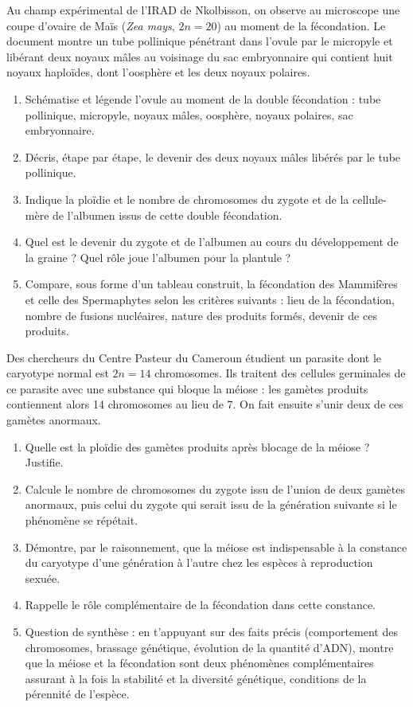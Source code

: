 \documentclass[11pt]{article}
\begin{document}
\begin{exercice}
Au champ expérimental de l'IRAD de Nkolbisson, on observe au microscope une coupe d'ovaire de Maïs (\emph{Zea mays}, $2n = 20$) au moment de la fécondation. Le document montre un tube pollinique pénétrant dans l'ovule par le micropyle et libérant deux noyaux mâles au voisinage du sac embryonnaire qui contient huit noyaux haploïdes, dont l'oosphère et les deux noyaux polaires.
\begin{enumerate}
\item Schématise et légende l'ovule au moment de la double fécondation : tube pollinique, micropyle, noyaux mâles, oosphère, noyaux polaires, sac embryonnaire.
\item Décris, étape par étape, le devenir des deux noyaux mâles libérés par le tube pollinique.
\item Indique la ploïdie et le nombre de chromosomes du zygote et de la cellule-mère de l'albumen issus de cette double fécondation.
\item Quel est le devenir du zygote et de l'albumen au cours du développement de la graine ? Quel rôle joue l'albumen pour la plantule ?
\item Compare, sous forme d'un tableau construit, la fécondation des Mammifères et celle des Spermaphytes selon les critères suivants : lieu de la fécondation, nombre de fusions nucléaires, nature des produits formés, devenir de ces produits.
\end{enumerate}
\end{exercice}

\begin{exercice}
Des chercheurs du Centre Pasteur du Cameroun étudient un parasite dont le caryotype normal est $2n = 14$ chromosomes. Ils traitent des cellules germinales de ce parasite avec une substance qui bloque la méiose : les gamètes produits contiennent alors 14 chromosomes au lieu de 7. On fait ensuite s'unir deux de ces gamètes anormaux.
\begin{enumerate}
\item Quelle est la ploïdie des gamètes produits après blocage de la méiose ? Justifie.
\item Calcule le nombre de chromosomes du zygote issu de l'union de deux gamètes anormaux, puis celui du zygote qui serait issu de la génération suivante si le phénomène se répétait.
\item Démontre, par le raisonnement, que la méiose est indispensable à la constance du caryotype d'une génération à l'autre chez les espèces à reproduction sexuée.
\item Rappelle le rôle complémentaire de la fécondation dans cette constance.
\item Question de synthèse : en t'appuyant sur des faits précis (comportement des chromosomes, brassage génétique, évolution de la quantité d'ADN), montre que la méiose et la fécondation sont deux phénomènes complémentaires assurant à la fois la stabilité et la diversité génétique, conditions de la pérennité de l'espèce.
\end{enumerate}
\end{exercice}
\end{document}
